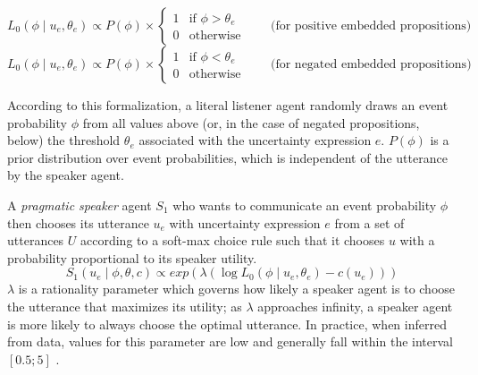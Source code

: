 \documentclass[man, floatsintext]{apa6}
\begin{document}
$$L_0\left(\phi \mid u_e, \theta_e\right) \propto P(\phi) \times 
\begin{cases}
1 & \mbox{if } \phi > \theta_e\\
0 & \mbox{otherwise} 
\end{cases} \qquad \mbox{(for positive embedded propositions)}$$
$$L_0\left(\phi \mid u_e, \theta_e\right) \propto P(\phi) \times 
\begin{cases}
1 & \mbox{if } \phi < \theta_e\\
0 & \mbox{otherwise} 
\end{cases} \qquad \mbox{(for negated embedded propositions)}$$

According to this formalization, a literal listener agent randomly draws an event probability $\phi$ from all values above (or, in the case of negated propositions, below) the threshold $\theta_e$ associated with the uncertainty expression $e$. $P(\phi)$ is a prior distribution over event probabilities, which is independent of the utterance by the speaker agent.

A \textit{pragmatic speaker} agent $S_1$ who wants to communicate an event probability $\phi$ then chooses its utterance $u_e$ with uncertainty expression $e$ from a set of utterances $U$ according to a soft-max choice rule \parencite{Luce1959,Sutton1998} such that it chooses $u$ with a probability proportional to its speaker utility. 
$$S_1\left(u_e \mid \phi, \theta, c\right) \propto exp \left( \lambda \left( \log L_0\left(\phi \mid u_e, \theta_e\right)  - c(u_e)\right)\right)$$
$\lambda$ is a rationality parameter which governs how likely a speaker agent is to choose the utterance that maximizes its utility; as $\lambda$ approaches infinity, a speaker agent is more likely to always choose the optimal utterance.
In practice, when inferred from data, values for this parameter are low and generally fall within the interval $[0.5; 5]$ \parencite[see, e.g.,][]{Herbstritt2019,Tessler2019}. 
\end{document}
